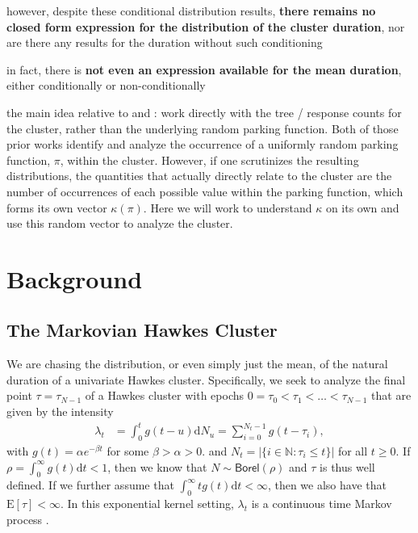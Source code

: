 \documentclass[stsy,dblanonrev]{amers/INFORMS-STSY-Template-26-02-2026/informs4}
\newcommand{\E}[1]{{\mathrm{E}\left[#1\right]}}
\begin{document}
however, despite these conditional distribution results, \textbf{there remains no closed form expression for the distribution of the cluster duration}, nor are there any results for the duration without such conditioning

in fact, there is \textbf{not even an expression available for the mean duration}, either conditionally or non-conditionally

the main idea relative to \citet{daw2023conditional} and \citet{daw2024asymmetries}: work directly with the tree / response counts for the cluster, rather than the underlying random parking function. Both of those prior works identify and analyze the occurrence of a uniformly random parking function, $\pi$, within the cluster. However, if one scrutinizes the resulting distributions, the quantities that actually directly relate to the cluster are the number of occurrences of each possible value within the parking function, which forms its own  vector $\kappa(\pi)$. Here we will work to understand $\kappa$ on its own and use this random vector to analyze the cluster.

\section{Background}\label{sec:background}
\subsection{The Markovian Hawkes Cluster}
We are chasing the distribution, or even simply just the mean, of the natural duration of a univariate Hawkes cluster. Specifically, we seek to analyze the final point $\tau = \tau_{N-1}$ of a Hawkes cluster with epochs $0 = \tau_0 < \tau_1 < \dots < \tau_{N-1}$ that are given by the intensity
\begin{align*}
\lambda_t
&=
\int_0^t g(t-u)\mathrm{d}N_u
=
\sum_{i=0}^{N_t-1}
g(t-\tau_i)
,
\end{align*}
with $g(t) = \alpha e^{-\beta t}$ for some $\beta > \alpha > 0$. and $N_t = |\{i \in \mathbb{N} : \tau_i \leq t\}|$ for all $t \geq 0$. If $\rho = \int_0^\infty g(t) \mathrm{d}t < 1$, then we know that $N \sim \mathsf{Borel}(\rho)$ and $\tau$ is thus well defined. If we further assume that $\int_0^\infty t g(t) \mathrm{d}t < \infty$, then we also have that $\E{\tau} < \infty$. In this exponential kernel setting, $\lambda_t$ is a continuous time Markov process \citep{oakes1975markovian}.
\end{document}
